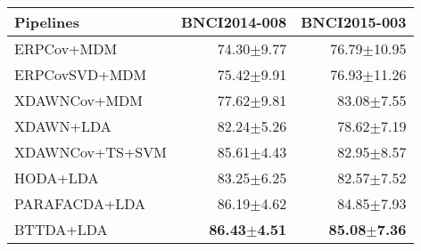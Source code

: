 \sffamily
\small
\begin{tabular}{@{}lrr@{}}
\toprule
      Pipelines &            BNCI2014-008 &            BNCI2015-003 \\
\midrule
     ERPCov+MDM &          74.30$\pm$9.77 &          76.79$\pm$10.95 \\
  ERPCovSVD+MDM &          75.42$\pm$9.91 &          76.93$\pm$11.26 \\
   XDAWNCov+MDM &          77.62$\pm$9.81 &          83.08$\pm$7.55 \\
      XDAWN+LDA &          82.24$\pm$5.26 &          78.62$\pm$7.19 \\
XDAWNCov+TS+SVM &          85.61$\pm$4.43 &          82.95$\pm$8.57 \\\midrule
       HODA+LDA &          83.25$\pm$6.25 &          82.57$\pm$7.52 \\
  PARAFACDA+LDA &          86.19$\pm$4.62 &          84.85$\pm$7.93 \\
      BTTDA+LDA & \textbf{86.43\boldmath$\pm$4.51} & \textbf{85.08\boldmath$\pm$7.36} \\
\bottomrule
\end{tabular}
